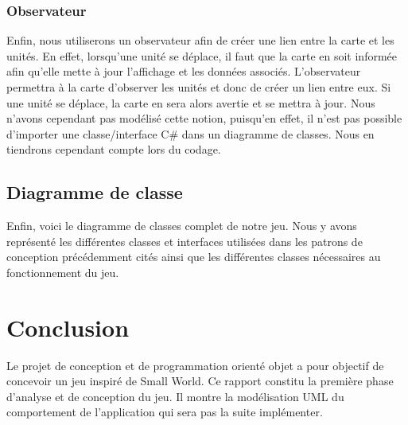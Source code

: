 \documentclass[a4paper]{article}%
\begin{document}
\subsubsection{Observateur}
Enfin, nous utiliserons un observateur afin de créer une lien entre la carte et les unités. En effet, lorsqu'une unité se déplace, il faut que la carte en soit informée afin qu'elle mette à jour l'affichage et les données associés. 
L'observateur permettra à la carte d'observer les unités et donc de créer un lien entre eux. Si une unité se déplace, la carte en sera alors avertie et se mettra à jour. 
Nous n'avons cependant pas modélisé cette notion, puisqu'en effet, il n'est pas possible d'importer une classe/interface C\# dans un diagramme de classes. Nous en tiendrons cependant compte lors du codage.


\subsection{Diagramme de classe}
Enfin, voici le diagramme de classes complet de notre jeu. Nous y avons représenté les différentes classes et interfaces utilisées dans les patrons de conception précédemment cités ainsi que les différentes classes nécessaires au fonctionnement du jeu.


\newpage

\section*{Conclusion}

Le projet de conception et de programmation orienté objet a pour objectif de concevoir un jeu inspiré de Small World. Ce rapport constitu la première phase d'analyse et de conception du jeu. Il montre la modélisation UML du comportement de l'application qui sera pas la suite implémenter.


\newpage
\listoffigures
\end{document}
